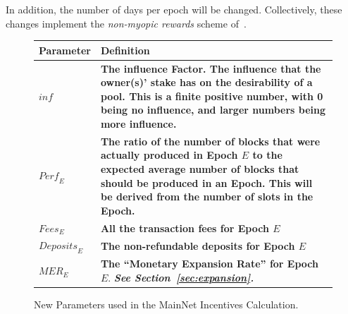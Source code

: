 \documentclass[11pt,a4paper,dvipsnames,twosided,final]{article}
\begin{document}
\noindent
In addition, the number of days per epoch will be changed.  Collectively, these changes implement the \emph{non-myopic rewards} scheme of~\cite{delegation_design}.

\begin{figure}[h!]
\begin{center}
\begin{tabular}{||l|p{13cm}||}
  \hline \hline
  \textbf{Parameter} & \textbf{Definition} \\\hline
\textbf{\color{green}  $\textit{inf}$} & \textbf{\color{green} The influence Factor. The influence that the owner(s)' stake has on the
  desirability of a pool. This is a finite positive number, with 0 being no influence, and larger numbers being more influence. } \\\hline
\textbf{\color{cyan}  $\textit{Perf}_E$} & \textbf{\color{cyan} The ratio of the number of blocks that were actually produced in Epoch $E$ to the expected average number of blocks that should be produced in an Epoch.
  This will be derived from the number of slots in the Epoch.} \\\hline
\textbf{\color{cyan}$\textit{Fees}_E$} & \textbf{\color{cyan}All the transaction fees for Epoch $E$} \\\hline
\textbf{\color{cyan}$\textit{Deposits}_E$} & \textbf{\color{cyan} The non-refundable deposits for Epoch $E$} \\\hline
\textbf{\color{cyan} $\textit{MER}_E$} & \textbf{\color{cyan} The ``Monetary Expansion Rate'' for Epoch $E$}. \newline \textbf{\color{cyan} \emph{See Section~\ref{sec:expansion}.}} \\\hline
\hline
\end{tabular}
\end{center}
\caption{New Parameters used in the MainNet Incentives Calculation.}
\end{figure}
\end{document}
